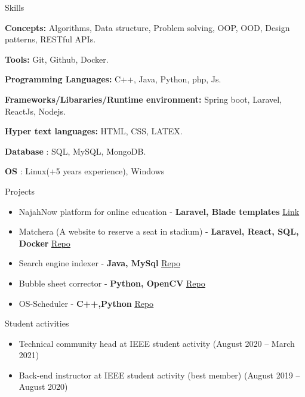 \documentclass{resume}
\begin{document}

\begin{rSection}{Skills}
  \item \textbf{Concepts:} Algorithms, Data structure, Problem solving, OOP, OOD, Design patterns, RESTful APIs.
  \item \textbf{Tools:} Git, Github, Docker.
  \item \textbf{Programming Languages:} C++, Java, Python, php, Js.
  \item \textbf{Frameworks/Libararies/Runtime environment:} Spring boot, Laravel, ReactJs, Nodejs.
  \item \textbf{Hyper text languages:} HTML, CSS, LATEX.
  \item \textbf{Database}  : SQL, MySQL, MongoDB.
  \item \textbf{OS} : Linux(+5 years experience), Windows
\end{rSection}

\begin{rSection}{Projects}
  \begin{itemize}
    \item NajahNow platform for online education - \textbf{Laravel, Blade templates} \hfill{\underline{\href{https://najahnow.net}{Link}}}
    \item Matchera (A website to reserve a seat in stadium) - \textbf{Laravel, React, SQL, Docker} \hfill{\underline{\href{https://github.com/sofyanmahmoud0000/Matchera}{Repo}}}
    \item Search engine indexer - \textbf{Java, MySql} \hfill{\underline{\href{https://github.com/sofyanmahmoud0000/Jindexer}{Repo}}}
    \item Bubble sheet corrector - \textbf{Python, OpenCV} \hfill{\underline{\href{https://github.com/sofyanmahmoud0000/BSCorrector}{Repo}}}
    \item OS-Scheduler - \textbf{C++,Python} \hfill{\underline{\href{https://github.com/sofyanmahmoud0000/OS-Scheduler}{Repo}}}
  \end{itemize}
\end{rSection}

\begin{rSection}{Student activities}
  \begin{itemize}
    \item Technical community head at IEEE student activity \hfill{(August 2020 – March 2021)}
    \item Back-end instructor at IEEE student activity (best member) \hfill{(August 2019 – August 2020)}
  \end{itemize}
\end{rSection}
\end{document}
